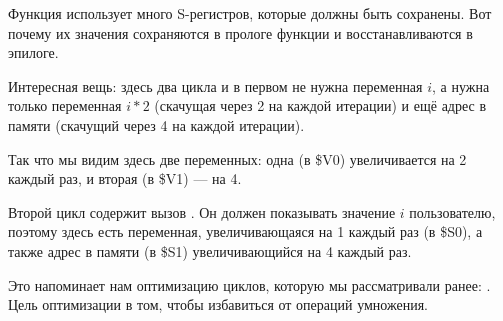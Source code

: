 ﻿
Функция использует много S-регистров, которые должны быть сохранены. Вот почему их значения сохраняются
в прологе функции и восстанавливаются в эпилоге.



Интересная вещь: здесь два цикла и в первом не нужна переменная $i$, а нужна только переменная
$i*2$ (скачущая через 2 на каждой итерации) и ещё адрес в памяти (скачущий через 4 на каждой итерации).

Так что мы видим здесь две переменных: одна (в \$V0) увеличивается на 2 каждый раз, и вторая (в \$V1) --- на 4.

Второй цикл содержит вызов \printf. Он должен показывать значение $i$ пользователю,
поэтому здесь есть переменная, увеличивающаяся на 1 каждый раз (в \$S0), а также адрес в памяти (в \$S1) 
увеличивающийся на 4 каждый раз.

Это напоминает нам оптимизацию циклов, которую мы рассматривали ранее: .
Цель оптимизации в том, чтобы избавиться от операций умножения.


